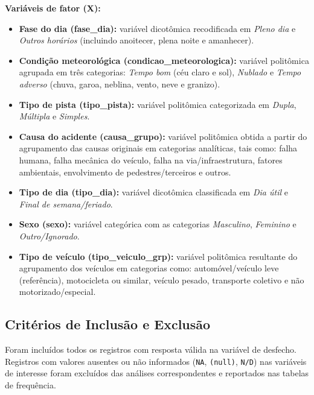 \documentclass[
  brazilian,
  12pt,
]{article}
\providecommand{\tightlist}{%
  \setlength{\itemsep}{0pt}\setlength{\parskip}{0pt}}
\begin{document}
\textbf{Variáveis de fator (X):}

\begin{itemize}
\tightlist
\item
  \textbf{Fase do dia (fase\_dia):} variável dicotômica recodificada em
  \emph{Pleno dia} e \emph{Outros horários} (incluindo anoitecer, plena
  noite e amanhecer).
\end{itemize}

\begin{itemize}
\item
  \textbf{Condição meteorológica (condicao\_meteorologica):} variável
  politômica agrupada em três categorias: \emph{Tempo bom} (céu claro e
  sol), \emph{Nublado} e \emph{Tempo adverso} (chuva, garoa, neblina,
  vento, neve e granizo).
\item
  \textbf{Tipo de pista (tipo\_pista):} variável politômica categorizada
  em \emph{Dupla}, \emph{Múltipla} e \emph{Simples}.
\item
  \textbf{Causa do acidente (causa\_grupo):} variável politômica obtida
  a partir do agrupamento das causas originais em categorias analíticas,
  tais como: falha humana, falha mecânica do veículo, falha na
  via/infraestrutura, fatores ambientais, envolvimento de
  pedestres/terceiros e outros.
\item
  \textbf{Tipo de dia (tipo\_dia):} variável dicotômica classificada em
  \emph{Dia útil} e \emph{Final de semana/feriado}.
\item
  \textbf{Sexo (sexo):} variável categórica com as categorias
  \emph{Masculino}, \emph{Feminino} e \emph{Outro/Ignorado}.
\item
  \textbf{Tipo de veículo (tipo\_veiculo\_grp):} variável politômica
  resultante do agrupamento dos veículos em categorias como:
  automóvel/veículo leve (referência), motocicleta ou similar, veículo
  pesado, transporte coletivo e não motorizado/especial.
\end{itemize}

\subsection{Critérios de Inclusão e
Exclusão}\label{crituxe9rios-de-inclusuxe3o-e-exclusuxe3o}

Foram incluídos todos os registros com resposta válida na variável de
desfecho. Registros com valores ausentes ou não informados (\texttt{NA},
\texttt{(null)}, \texttt{N/D}) nas variáveis de interesse foram
excluídos das análises correspondentes e reportados nas tabelas de
frequência.
\end{document}
